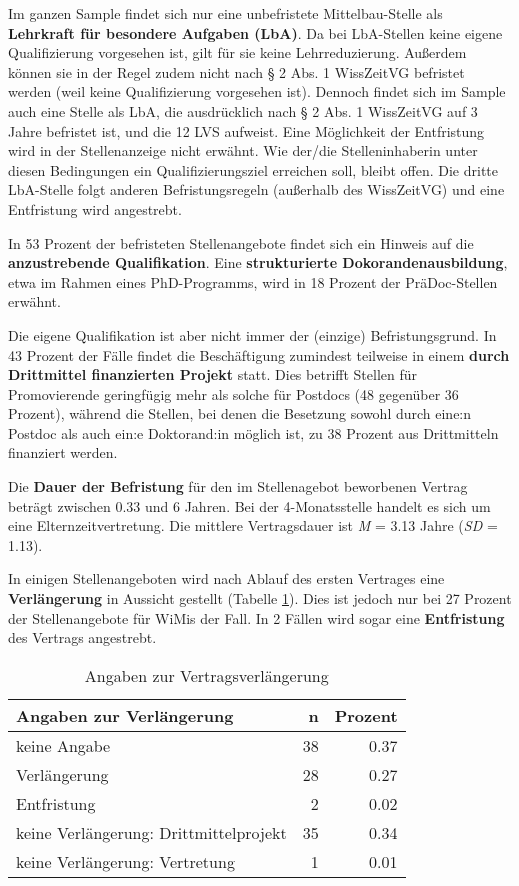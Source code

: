 \documentclass[
]{article}
\begin{document}
Im ganzen Sample findet sich nur eine unbefristete Mittelbau-Stelle als \textbf{Lehrkraft für besondere Aufgaben (LbA)}. Da bei LbA-Stellen keine eigene Qualifizierung vorgesehen ist, gilt für sie keine Lehrreduzierung. Außerdem können sie in der Regel zudem nicht nach § 2 Abs. 1 WissZeitVG befristet werden (weil keine Qualifizierung vorgesehen ist). Dennoch findet sich im Sample auch eine Stelle als LbA, die ausdrücklich nach § 2 Abs. 1 WissZeitVG auf 3 Jahre befristet ist, und die 12 LVS aufweist. Eine Möglichkeit der Entfristung wird in der Stellenanzeige nicht erwähnt. Wie der/die Stelleninhaberin unter diesen Bedingungen ein Qualifizierungsziel erreichen soll, bleibt offen. Die dritte LbA-Stelle folgt anderen Befristungsregeln (außerhalb des WissZeitVG) und eine Entfristung wird angestrebt.

In 53 Prozent der befristeten Stellenangebote findet sich ein Hinweis auf die \textbf{anzustrebende Qualifikation}. Eine \textbf{strukturierte Dokorandenausbildung}, etwa im Rahmen eines PhD-Programms, wird in 18 Prozent der PräDoc-Stellen erwähnt.

Die eigene Qualifikation ist aber nicht immer der (einzige) Befristungsgrund. In 43 Prozent der Fälle findet die Beschäftigung zumindest teilweise in einem \textbf{durch Drittmittel finanzierten Projekt} statt. Dies betrifft Stellen für Promovierende geringfügig mehr als solche für Postdocs (48 gegenüber 36 Prozent), während die Stellen, bei denen die Besetzung sowohl durch eine:n Postdoc als auch ein:e Doktorand:in möglich ist, zu 38 Prozent aus Drittmitteln finanziert werden.

Die \textbf{Dauer der Befristung} für den im Stellenagebot beworbenen Vertrag beträgt zwischen 0.33 und 6 Jahren. Bei der 4-Monatsstelle handelt es sich um eine Elternzeitvertretung. Die mittlere Vertragsdauer ist \emph{M} = 3.13 Jahre (\emph{SD} = 1.13).

In einigen Stellenangeboten wird nach Ablauf des ersten Vertrages eine \textbf{Verlängerung} in Aussicht gestellt (Tabelle \ref{tab:limitextension}). Dies ist jedoch nur bei 27 Prozent der Stellenangebote für WiMis der Fall. In 2 Fällen wird sogar eine \textbf{Entfristung} des Vertrags angestrebt.

\begin{table}[H]

\caption{\label{tab:limitextension}Angaben zur Vertragsverlängerung}
\centering
\begin{tabular}[t]{l|r|r}
\hline
Angaben zur Verlängerung & n & Prozent\\
\hline
keine Angabe & 38 & 0.37\\
\hline
Verlängerung & 28 & 0.27\\
\hline
Entfristung & 2 & 0.02\\
\hline
keine Verlängerung: Drittmittelprojekt & 35 & 0.34\\
\hline
keine Verlängerung: Vertretung & 1 & 0.01\\
\hline
\end{tabular}
\end{table}
\end{document}
